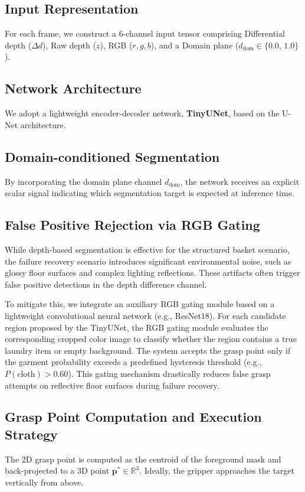 \documentclass[pdflatex,sn-mathphys-num]{sn-jnl}%
\theoremstyle{thmstyleone}%
\theoremstyle{thmstyletwo}%
\theoremstyle{thmstylethree}%
\begin{document}
\subsection{Input Representation}
\label{sec:input_repr}
For each frame, we construct a 6-channel input tensor comprising Differential depth ($\Delta d$), Raw depth ($z$), RGB ($r, g, b$), and a Domain plane ($d_\text{dom} \in \{0.0,\, 1.0\}$).

\subsection{Network Architecture}
\label{sec:tinyunet}
We adopt a lightweight encoder-decoder network, \textbf{TinyUNet}, based on the U-Net architecture.

\subsection{Domain-conditioned Segmentation}
\label{sec:domain_cond}
By incorporating the domain plane channel $d_\text{dom}$, the network receives an explicit scalar signal indicating which segmentation target is expected at inference time.

\subsection{False Positive Rejection via RGB Gating}
\label{sec:rgb_gating}
While depth-based segmentation is effective for the structured basket scenario, the failure recovery scenario introduces significant environmental noise, such as glossy floor surfaces and complex lighting reflections. These artifacts often trigger false positive detections in the depth difference channel.

To mitigate this, we integrate an auxiliary RGB gating module based on a lightweight convolutional neural network (e.g., ResNet18). For each candidate region proposed by the TinyUNet, the RGB gating module evaluates the corresponding cropped color image to classify whether the region contains a true laundry item or empty background. The system accepts the grasp point only if the garment probability exceeds a predefined hysteresis threshold (e.g., $P(\text{cloth}) > 0.60$). This gating mechanism drastically reduces false grasp attempts on reflective floor surfaces during failure recovery.

\subsection{Grasp Point Computation and Execution Strategy}
\label{sec:grasp_point}
The 2D grasp point is computed as the centroid of the foreground mask and back-projected to a 3D point $\mathbf{p}^* \in \mathbb{R}^3$. Ideally, the gripper approaches the target vertically from above.
\end{document}
